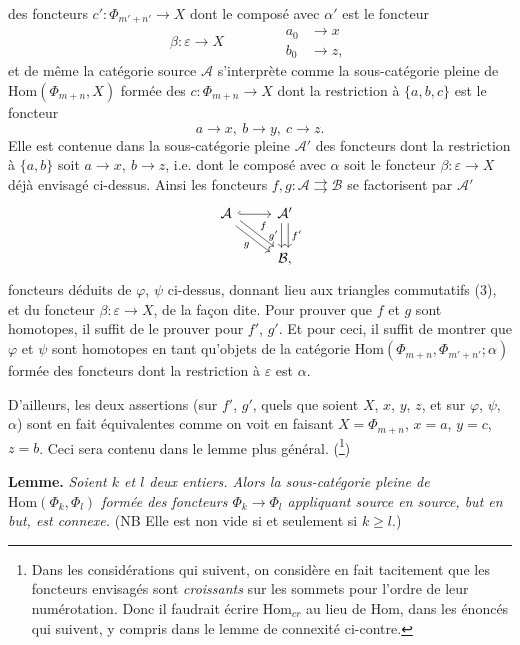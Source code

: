 \documentclass[11pt]{article}
\newcommand{\printedpage}[1]{\marginpar{\footnotesize p.~#1}}
\newcommand{\msp}[1]{\marginpar{\footnotesize [#1]}}
\newcommand{\Hom}{\mathrm{Hom}}
\begin{document}
\msp{page 16}
des foncteurs $c':\Phi_{m'+n'}\longrightarrow X$ dont le composé avec $\alpha'$ est le foncteur
\[
\beta:\varepsilon\longrightarrow X\qquad\qquad
\begin{aligned}
a_0&\longrightarrow x\\
b_0&\longrightarrow z,
\end{aligned} \tag*{$(*)$}
\]
et de même la catégorie source $\mathcal{A}$ s'interprète comme la sous-catégorie pleine de $\Hom(\Phi_{m+n},X)$ formée des $c:\Phi_{m+n}\longrightarrow X$ dont la restriction à $\{a,b,c\}$ est le foncteur
\[
a\longrightarrow x,\ b\longrightarrow y,\ c\longrightarrow z.
\]
 Elle est contenue dans la sous-catégorie pleine $\mathcal{A}'$ des foncteurs dont la restriction à $\{a,b\}$ soit $a\longrightarrow x,\ b\longrightarrow z$, i.e. dont le composé avec $\alpha$ soit le foncteur $\beta:\varepsilon\longrightarrow X$ déjà envisagé ci-dessus. Ainsi les foncteurs $f,g:\mathcal{A}\rightrightarrows\mathcal{B}$ se factorisent par $\mathcal{A}'$
\printedpage{11}
\[
\begin{tikzcd}
\mathcal{A} \arrow[r,hook] \arrow[dr,shift left,"f"] \arrow[dr,shift right,"g"'] & \mathcal{A}' \arrow[d,shift right,"g'"'] \arrow[d,shift left,"f'"] \\
 & \mathcal{B},
\end{tikzcd}
\]
foncteurs déduits de $\varphi$, $\psi$ ci-dessus, donnant lieu aux triangles commutatifs (3), et du foncteur $\beta:\varepsilon\longrightarrow X$, de la façon dite. Pour prouver que $f$ et $g$ sont homotopes, il suffit de le prouver pour $f'$, $g'$. Et pour ceci, il suffit de montrer que $\varphi$ et $\psi$ sont homotopes en tant qu'objets de la catégorie $\Hom(\Phi_{m+n},\Phi_{m'+n'};\alpha)$ formée des foncteurs dont la restriction à $\varepsilon$ est $\alpha$.

\msp{page 17}
D'ailleurs, les deux assertions (sur $f'$, $g'$, quels que soient $X$, $x$, $y$, $z$, et sur $\varphi$, $\psi$, $\alpha$) sont en fait équivalentes comme on voit en faisant $X=\Phi_{m+n}$, $x=a$, $y=c$, $z=b$. Ceci sera contenu dans le lemme plus général. (\footnote[4]{Dans les considérations qui suivent, on considère en fait tacitement que les foncteurs envisagés sont \textit{croissants} sur les sommets pour l'ordre de leur numérotation. Donc il faudrait écrire $\Hom_{cr}$ au lieu de $\Hom$, dans les énoncés qui suivent, y compris dans le lemme de connexité ci-contre.})

\textbf{Lemme.} \textit{Soient $k$ et $l$ deux entiers. Alors la sous-catégorie pleine de $\Hom(\Phi_k,\Phi_l)$ formée des foncteurs $\Phi_k\longrightarrow\Phi_l$ appliquant source en source, but en but, est connexe.} (NB Elle est non vide si et seulement si $k\geq l$.)
\end{document}
